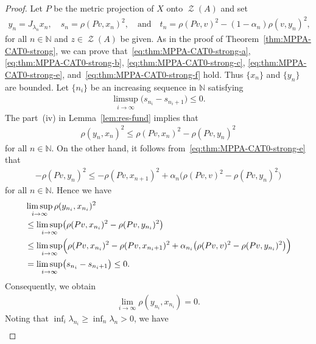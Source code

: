 \documentclass[draft]{amsart}
\numberwithin{equation}{section}
\def\N{\mathbb N}
\DeclareMathOperator{\Zer}{\mathcal{Z}}
\theoremstyle{plain}
\theoremstyle{definition}
\theoremstyle{remark}
\begin{document}
\begin{proof}
 Let $P$ be the metric projection of $X$ onto $\Zer(A)$ and set 
 \begin{align*}
  y_n=J_{\lambda_n}x_n, \quad 
  s_n=\rho(Pv, x_n)^2, \quad \textrm{and} \quad t_n = \rho(Pv, v)^2 -(1-\alpha_n)\rho(v, y_n)^2, 
 \end{align*}
 for all $n\in \N$ and $z\in \Zer(A)$ be given. As in the proof of Theorem~\ref{thm:MPPA-CAT0-strong}, 
 we can prove that~\eqref{eq:thm:MPPA-CAT0-strong-a}, \eqref{eq:thm:MPPA-CAT0-strong-b}, 
\eqref{eq:thm:MPPA-CAT0-strong-c}, 
\eqref{eq:thm:MPPA-CAT0-strong-e}, 
and~\eqref{eq:thm:MPPA-CAT0-strong-f} hold.  
 Thus $\{x_n\}$ and $\{y_n\}$ are bounded. Let $\{n_i\}$ be an increasing sequence in $\N$ 
 satisfying 
 \begin{align*}
  \limsup_{i\to \infty} \bigl(s_{n_i}-s_{n_i+1}\bigr) \leq 0. 
 \end{align*}
 The part~(iv) in Lemma~\ref{lem:res-fund} implies that 
 \begin{align*}
  \rho(y_n,x_n)^2 \leq \rho(Pv, x_n)^2 - \rho(Pv, y_n)^2
 \end{align*}
 for all $n\in \N$. On the other hand, it follows from~\eqref{eq:thm:MPPA-CAT0-strong-e} that 
 \begin{align*}
  - \rho(Pv, y_n)^2 
  \leq - \rho(Pv, x_{n+1})^2 + \alpha_n \bigl(\rho(Pv, v)^2 - \rho(Pv, y_n)^2 \bigr)
 \end{align*}
 for all $n\in \N$. Hence we have 
 \begin{align*}
  \begin{split}
   &\limsup_{i\to \infty} \rho(y_{n_i}, x_{n_i})^2 \\
   &\leq \limsup_{i\to \infty} \bigl(\rho(Pv, x_{n_i})^2 - \rho(Pv, y_{n_i})^2\bigr) \\
   &\leq \limsup_{i\to \infty} 
  \Bigl(
   \rho(Pv, x_{n_i})^2 - \rho(Pv, x_{n_i+1})^2 + \alpha_{n_i} 
   \bigl(\rho(Pv, v)^2 - \rho(Pv, y_{n_i})^2 \bigr)
  \Bigr) \\
   &=\limsup_{i\to \infty} \bigl(s_{n_i} -s_{n_i+1}\bigr) \leq 0. 
  \end{split}
 \end{align*}
 Consequently, we obtain 
 \begin{align*}
  \lim_{i\to \infty} \rho(y_{n_i}, x_{n_i}) =0. 
 \end{align*}
 Noting that $\inf_i \lambda_{n_i}\geq \inf_n \lambda_n >0$, we have 
 \begin{align}\label{eq:thm:MPPA-CAT0-strong-another-a}

\end{align}
\end{proof}
\end{document}
